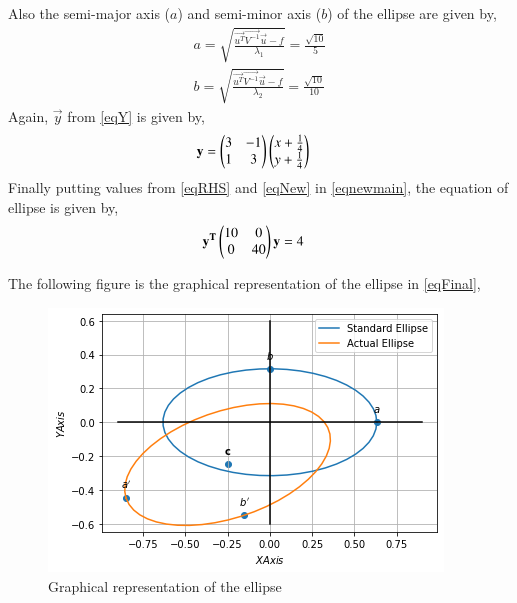 \documentclass[journal,12pt,twocolumn]{IEEEtran}
\begin{document}
Also the semi-major axis ($a$) and semi-minor axis ($b$) of the ellipse are given by,
\begin{align}
a = \sqrt{\frac{\vec{u^T}\vec{V^{-1}}\vec{u}-f}{\lambda_1}}=\frac{\sqrt{10}}{5}\\
b = \sqrt{\frac{\vec{u^T}\vec{V^{-1}}\vec{u}-f}{\lambda_2}}=\frac{\sqrt{10}}{10}
\end{align}
Again, $\vec{y}$ from \eqref{eqY} is given by,
\begin{align}
\mathbf{y} &= \begin{pmatrix}3&-1\\1&3\end{pmatrix}\begin{pmatrix}x+\frac{1}{4}\\y+\frac{1}{4}\end{pmatrix}\label{eqNew}
\end{align}
Finally putting values from \eqref{eqRHS} and \eqref{eqNew} in \eqref{eqnewmain}, the equation of ellipse is given by,
\begin{align}
&\mathbf{y^T}\begin{pmatrix}10&0\\0&40\end{pmatrix}\mathbf{y}=4\label{eqFinal}
\end{align}

The following figure is the graphical representation of the ellipse in \eqref{eqFinal},
\renewcommand{\thefigure}{1}
\begin{figure}[h!]
\centering
\includegraphics[width = \columnwidth]{Ellipse.png}
\caption{Graphical representation of the ellipse}
\label{fig:my_label}
\end{figure}
\end{document}
